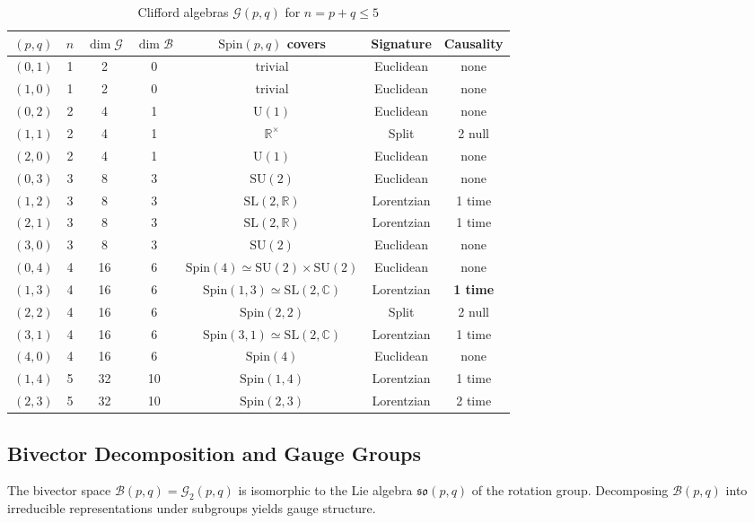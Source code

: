 \documentclass[11pt,a4paper]{article}
\numberwithin{equation}{section}
\theoremstyle{plain}
\theoremstyle{definition}
\theoremstyle{remark}
\newcommand{\R}{\mathbb{R}}
\newcommand{\C}{\mathbb{C}}
\newcommand{\Cl}{\mathcal{G}}               %
\newcommand{\Biv}{\mathcal{B}}             %
\newcommand{\Spin}{\mathrm{Spin}}
\begin{document}
\begin{table}[h]
\centering
\caption{Clifford algebras $\Cl(p,q)$ for $n = p+q \leq 5$}
\label{tab:clifford-catalog}
\begin{tabular}{ccccccc}
\toprule
$(p,q)$ & $n$ & $\dim \Cl$ & $\dim \Biv$ & $\Spin(p,q)$ covers & Signature & Causality \\
\midrule
$(0,1)$ & 1 & 2 & 0 & trivial & Euclidean & none \\
$(1,0)$ & 1 & 2 & 0 & trivial & Euclidean & none \\
$(0,2)$ & 2 & 4 & 1 & $\mathrm{U}(1)$ & Euclidean & none \\
$(1,1)$ & 2 & 4 & 1 & $\R^\times$ & Split & 2 null \\
$(2,0)$ & 2 & 4 & 1 & $\mathrm{U}(1)$ & Euclidean & none \\
$(0,3)$ & 3 & 8 & 3 & $\mathrm{SU}(2)$ & Euclidean & none \\
$(1,2)$ & 3 & 8 & 3 & $\mathrm{SL}(2,\R)$ & Lorentzian & 1 time \\
$(2,1)$ & 3 & 8 & 3 & $\mathrm{SL}(2,\R)$ & Lorentzian & 1 time \\
$(3,0)$ & 3 & 8 & 3 & $\mathrm{SU}(2)$ & Euclidean & none \\
$(0,4)$ & 4 & 16 & 6 & $\Spin(4) \simeq \mathrm{SU}(2) \times \mathrm{SU}(2)$ & Euclidean & none \\
$(1,3)$ & 4 & 16 & 6 & $\Spin(1,3) \simeq \mathrm{SL}(2,\C)$ & Lorentzian & \textbf{1 time} \\
$(2,2)$ & 4 & 16 & 6 & $\Spin(2,2)$ & Split & 2 null \\
$(3,1)$ & 4 & 16 & 6 & $\Spin(3,1) \simeq \mathrm{SL}(2,\C)$ & Lorentzian & 1 time \\
$(4,0)$ & 4 & 16 & 6 & $\Spin(4)$ & Euclidean & none \\
\midrule
$(1,4)$ & 5 & 32 & 10 & $\Spin(1,4)$ & Lorentzian & 1 time \\
$(2,3)$ & 5 & 32 & 10 & $\Spin(2,3)$ & Lorentzian & 2 time \\
\bottomrule
\end{tabular}
\end{table}

\subsection{Bivector Decomposition and Gauge Groups}

The bivector space $\Biv(p,q) = \Cl_2(p,q)$ is isomorphic to the Lie algebra $\mathfrak{so}(p,q)$ of the rotation group. Decomposing $\Biv(p,q)$ into irreducible representations under subgroups yields gauge structure.
\end{document}
